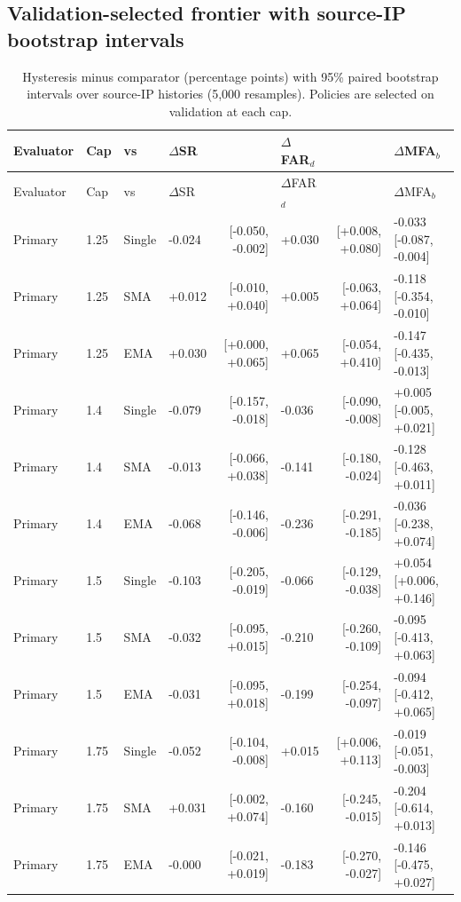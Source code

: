\subsection{Validation-selected frontier with source-IP bootstrap intervals}
{\footnotesize\setlength{\tabcolsep}{4pt}
\begin{longtable}{llllrlrl}
\caption{Hysteresis minus comparator (percentage points) with 95\% paired bootstrap intervals over source-IP histories (5,000 resamples). Policies are selected on validation at each cap.}\label{tab:s7_boot}\\
\toprule
Evaluator & Cap & vs & $\Delta$SR & & $\Delta$FAR$_d$ & & $\Delta$MFA$_b$\\
\midrule
\endfirsthead
\toprule
Evaluator & Cap & vs & $\Delta$SR & & $\Delta$FAR$_d$ & & $\Delta$MFA$_b$\\
\midrule
\endhead
\bottomrule
\endfoot
Primary & 1.25 & Single & -0.024 & [-0.050, -0.002] & +0.030 & [+0.008, +0.080] & -0.033 [-0.087, -0.004]\\
Primary & 1.25 & SMA & +0.012 & [-0.010, +0.040] & +0.005 & [-0.063, +0.064] & -0.118 [-0.354, -0.010]\\
Primary & 1.25 & EMA & +0.030 & [+0.000, +0.065] & +0.065 & [-0.054, +0.410] & -0.147 [-0.435, -0.013]\\
Primary & 1.4 & Single & -0.079 & [-0.157, -0.018] & -0.036 & [-0.090, -0.008] & +0.005 [-0.005, +0.021]\\
Primary & 1.4 & SMA & -0.013 & [-0.066, +0.038] & -0.141 & [-0.180, -0.024] & -0.128 [-0.463, +0.011]\\
Primary & 1.4 & EMA & -0.068 & [-0.146, -0.006] & -0.236 & [-0.291, -0.185] & -0.036 [-0.238, +0.074]\\
Primary & 1.5 & Single & -0.103 & [-0.205, -0.019] & -0.066 & [-0.129, -0.038] & +0.054 [+0.006, +0.146]\\
Primary & 1.5 & SMA & -0.032 & [-0.095, +0.015] & -0.210 & [-0.260, -0.109] & -0.095 [-0.413, +0.063]\\
Primary & 1.5 & EMA & -0.031 & [-0.095, +0.018] & -0.199 & [-0.254, -0.097] & -0.094 [-0.412, +0.065]\\
Primary & 1.75 & Single & -0.052 & [-0.104, -0.008] & +0.015 & [+0.006, +0.113] & -0.019 [-0.051, -0.003]\\
Primary & 1.75 & SMA & +0.031 & [-0.002, +0.074] & -0.160 & [-0.245, -0.015] & -0.204 [-0.614, +0.013]\\
Primary & 1.75 & EMA & -0.000 & [-0.021, +0.019] & -0.183 & [-0.270, -0.027] & -0.146 [-0.475, +0.027]\\

\end{longtable}}
